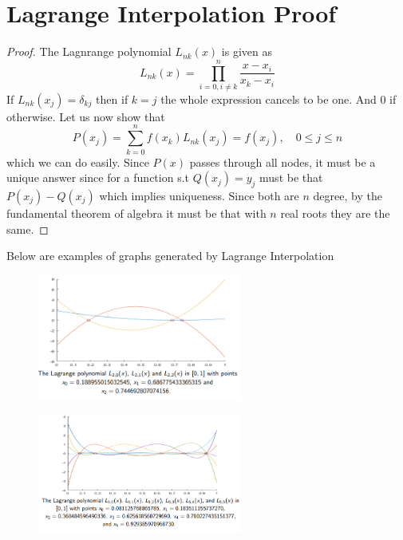 \section{Lagrange Interpolation Proof}
\begin{proof}
    The Lagnrange polynomial \(L_{nk} (x) \) is given as 
    \[
        L_{nk}(x) = 
        \prod_{i=0, i\neq  k}^n \frac{x-x_i}{x_k - x_i} 
    \]
    If \(L_{nk} (x_j) = \delta_{kj} \) then if \(k=j\) the whole expression cancels to be one. And \(0\) if otherwise. 
    Let us now show that 
    \[
        P(x_j) = \sum_{k=0}^{n} f(x_k)L_{nk} (x_j) = f(x_j), \quad 0 \leq  j \leq n
    \]
    which we can do easily. Since \(P(x)\) passes through all nodes, it must be a unique answer since for a function s.t 
    \(Q(x_j) = y_j\) must be that \(P(x_j)-Q(x_j)\) which implies uniqueness. Since both are \(n\) degree,
    by the fundamental theorem of algebra it must be that with \(n \) real roots they are the same. 
\end{proof}
\begin{eg}
    Below are examples of graphs generated by Lagrange Interpolation
\begin{figure}[H]
    \centering
    \includegraphics[width=0.6\textwidth]{Figures/01.png}
    \caption{}
    \label{fig:}
\end{figure}
\begin{figure}[H]
    \centering
    \includegraphics[width=0.6\textwidth]{Figures/02.png}
    \caption{}
    \label{fig:}
\end{figure}
\end{eg}

